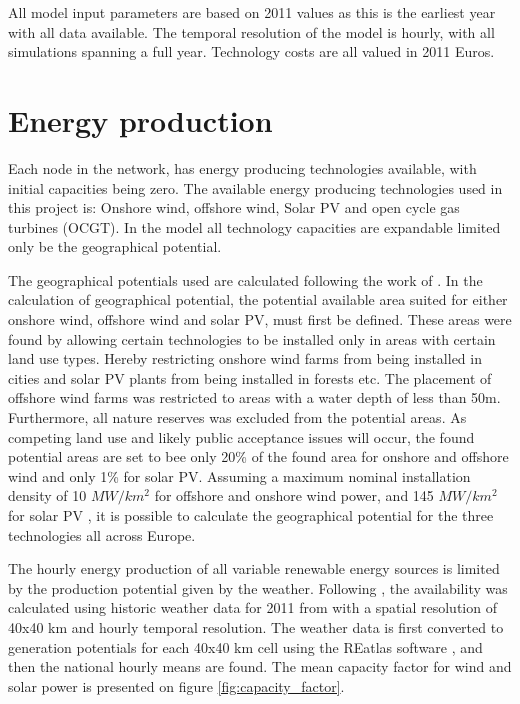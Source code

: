 All model input parameters are based on 2011 values as this is the earliest year with all data available. The temporal resolution of the model is hourly, with all simulations spanning a full year. Technology costs are all valued in 2011 Euros. 

\section{Energy production}

Each node in the network, has energy producing technologies available, with initial capacities being zero. The available energy producing technologies used in this project is: Onshore wind, offshore wind, Solar PV and open cycle gas turbines (OCGT). In the model all technology capacities are expandable limited only be the geographical potential. 

The geographical potentials used are calculated following the work of  \cite{PyPSA_euro_30_model}. In the calculation of geographical potential, the potential available area suited for either onshore wind, offshore wind and solar PV, must first be defined. These areas were found by allowing certain technologies to be installed only in areas with certain land use types. Hereby restricting onshore wind farms from being installed in cities and solar PV plants from being installed in forests etc. The placement of offshore wind farms was restricted to areas with a water depth of less than 50m. Furthermore, all nature reserves was excluded from the potential areas. As competing land use and likely public acceptance issues will occur, the found potential areas are set to bee only 20\% of the found area for onshore and offshore wind and only 1\% for solar PV. 
Assuming a maximum nominal installation density of 10 $MW/km^2$ for offshore and onshore wind power, and 145 $MW/km^2$ for solar PV \cite{PyPSA_euro_30_model}, it is possible to calculate the geographical potential for the three technologies all across Europe. 

The hourly energy production of all variable renewable energy sources is limited by the production potential given by the weather. Following \cite{PyPSA_euro_30_model}, the availability was calculated using historic weather data for 2011 from \cite{ClimateForecastSystem} with a spatial resolution of 40x40 km and hourly temporal resolution. The weather data is first converted to generation potentials for each 40x40 km cell using the REatlas software \cite{ANDRESEN20151074}, and then the national hourly means are found. The mean capacity factor for wind and solar power is presented on figure \ref{fig:capacity_factor}.


